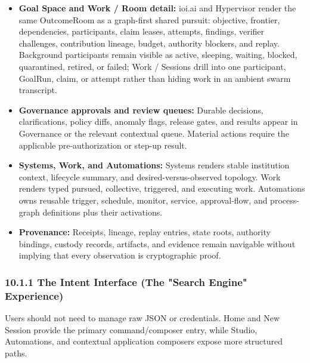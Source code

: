 \documentclass[
  11pt,
]{article}
\providecommand{\tightlist}{%
  \setlength{\itemsep}{0pt}\setlength{\parskip}{0pt}}
\begin{document}
\begin{itemize}
\tightlist
\item
  \textbf{Goal Space and Work / Room detail:} ioi.ai and Hypervisor render
  the same OutcomeRoom as a graph-first shared pursuit: objective,
  frontier, dependencies, participants, claim leases, attempts, findings,
  verifier challenges, contribution lineage, budget, authority blockers,
  and replay. Background participants remain visible as active, sleeping,
  waiting, blocked, quarantined, retired, or failed; Work / Sessions drill into
  one participant, GoalRun, claim, or attempt rather than hiding work in
  an ambient swarm transcript.
\item
  \textbf{Governance approvals and review queues:} Durable decisions,
  clarifications, policy diffs, anomaly flags, release gates, and results
  appear in Governance or the relevant contextual queue. Material actions
  require the applicable pre-authorization or step-up result.
\item
  \textbf{Systems, Work, and Automations:} Systems renders stable institution
  context, lifecycle summary, and desired-versus-observed topology. Work
  renders typed pursued, collective, triggered, and executing work.
  Automations owns reusable trigger, schedule, monitor, service,
  approval-flow, and process-graph definitions plus their activations.
\item
  \textbf{Provenance:} Receipts, lineage, replay entries, state roots,
  authority bindings, custody records, artifacts, and evidence remain
  navigable without implying that every observation is cryptographic proof.
\end{itemize}

\hypertarget{the-intent-interface-the-search-engine-experience}{%
\subsubsection{10.1.1 The Intent Interface (The "Search Engine"
Experience)}\label{the-intent-interface-the-search-engine-experience}}

Users should not need to manage raw JSON or credentials. Home and New
Session provide the primary command/composer entry, while Studio,
Automations, and contextual application composers expose more structured
paths.
\end{document}

